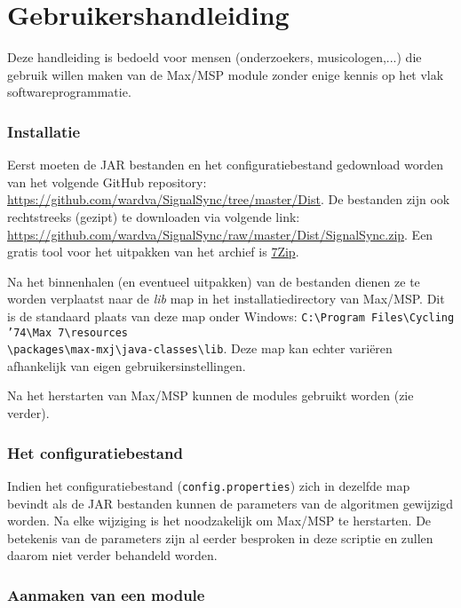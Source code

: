 \chapter{Gebruikershandleiding}
\label{appendix-d}

Deze handleiding is bedoeld voor mensen (onderzoekers, musicologen,...) die gebruik willen maken van de Max/MSP module zonder enige kennis op het vlak softwareprogrammatie.

\subsection*{Installatie}

Eerst moeten de JAR bestanden en het configuratiebestand gedownload worden van het volgende GitHub repository: \url{https://github.com/wardva/SignalSync/tree/master/Dist}. De bestanden zijn ook rechtstreeks (gezipt) te downloaden via volgende link: \url{https://github.com/wardva/SignalSync/raw/master/Dist/SignalSync.zip}. Een gratis tool voor het uitpakken van het archief is \href{http://www.7-zip.org/}{7Zip}.

Na het binnenhalen (en eventueel uitpakken) van de bestanden dienen ze te worden verplaatst naar de \emph{lib} map in het installatiedirectory van Max/MSP. Dit is de standaard plaats van deze map onder Windows: \texttt{C:\textbackslash Program Files\textbackslash Cycling '74\textbackslash Max 7\textbackslash resources\\\textbackslash packages\textbackslash max-mxj\textbackslash java-classes\textbackslash lib}. Deze map kan echter variëren afhankelijk van eigen gebruikersinstellingen.

Na het herstarten van Max/MSP kunnen de modules gebruikt worden (zie verder).

\subsection*{Het configuratiebestand}

Indien het configuratiebestand (\texttt{config.properties}) zich in dezelfde map bevindt als de JAR bestanden kunnen de parameters van de algoritmen gewijzigd worden. Na elke wijziging is het noodzakelijk om Max/MSP te herstarten. De betekenis van de parameters zijn al eerder besproken in deze scriptie en zullen daarom niet verder behandeld worden.

\subsection*{Aanmaken van een module}

